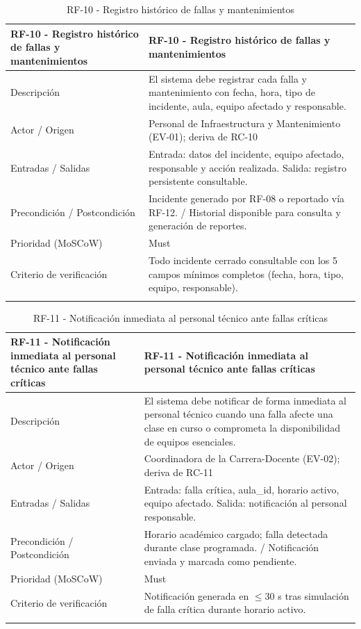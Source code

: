 \begingroup
\small
\begin{longtable}{|p{7.8cm}|p{7.8cm}|}
\hline
RF-10 - Registro histórico de fallas y mantenimientos & RF-10 - Registro histórico de fallas y mantenimientos \\ \hline
Descripción & El sistema debe registrar cada falla y mantenimiento con fecha, hora, tipo de incidente, aula, equipo afectado y responsable. \\ \hline
Actor / Origen & Personal de Infraestructura y Mantenimiento (EV-01); deriva de RC-10 \\ \hline
Entradas / Salidas & Entrada: datos del incidente, equipo afectado, responsable y acción realizada. Salida: registro persistente consultable. \\ \hline
Precondición / Postcondición & Incidente generado por RF-08 o reportado vía RF-12. / Historial disponible para consulta y generación de reportes. \\ \hline
Prioridad (MoSCoW) & Must \\ \hline
Criterio de verificación & Todo incidente cerrado consultable con los 5 campos mínimos completos (fecha, hora, tipo, equipo, responsable). \\ \hline
\caption{RF-10 - Registro histórico de fallas y mantenimientos}
\end{longtable}
\endgroup

\begingroup
\small
\begin{longtable}{|p{7.8cm}|p{7.8cm}|}
\hline
RF-11 - Notificación inmediata al personal técnico ante fallas críticas & RF-11 - Notificación inmediata al personal técnico ante fallas críticas \\ \hline
Descripción & El sistema debe notificar de forma inmediata al personal técnico cuando una falla afecte una clase en curso o comprometa la disponibilidad de equipos esenciales. \\ \hline
Actor / Origen & Coordinadora de la Carrera-Docente (EV-02); deriva de RC-11 \\ \hline
Entradas / Salidas & Entrada: falla crítica, aula\_id, horario activo, equipo afectado. Salida: notificación al personal responsable. \\ \hline
Precondición / Postcondición & Horario académico cargado; falla detectada durante clase programada. / Notificación enviada y marcada como pendiente. \\ \hline
Prioridad (MoSCoW) & Must \\ \hline
Criterio de verificación & Notificación generada en $\leq$30 s tras simulación de falla crítica durante horario activo. \\ \hline
\caption{RF-11 - Notificación inmediata al personal técnico ante fallas críticas}
\end{longtable}
\endgroup

